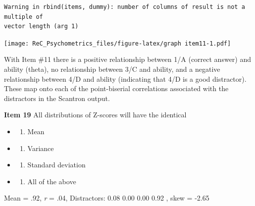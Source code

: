 \documentclass[
  english,
]{book}
\newenvironment{Shaded}{\begin{snugshade}}{\end{snugshade}}
\newcommand{\AttributeTok}[1]{\textcolor[rgb]{0.77,0.63,0.00}{#1}}
\newcommand{\DecValTok}[1]{\textcolor[rgb]{0.00,0.00,0.81}{#1}}
\newcommand{\FunctionTok}[1]{\textcolor[rgb]{0.00,0.00,0.00}{#1}}
\newcommand{\NormalTok}[1]{#1}
\newcommand{\SpecialCharTok}[1]{\textcolor[rgb]{0.00,0.00,0.00}{#1}}
\providecommand{\tightlist}{%
  \setlength{\itemsep}{0pt}\setlength{\parskip}{0pt}}
\begin{document}
\begin{verbatim}
Warning in rbind(items, dummy): number of columns of result is not a multiple of
vector length (arg 1)
\end{verbatim}

\texttt{[image: ReC\_Psychometrics\_files/figure-latex/graph item11-1.pdf]}

With Item \#11 there is a positive relationship between 1/A (correct answer) and ability (theta), no relationship between 3/C and ability, and a negative relationship between 4/D and ability (indicating that 4/D is a good distractor). These map onto each of the point-biserial correlations associated with the distractors in the Scantron output.

\textbf{Item 19} All distributions of Z-scores will have the identical

\begin{itemize}
\item
  \begin{enumerate}
  \def\labelenumi{\alph{enumi})}
  \tightlist
  \item
    Mean
  \end{enumerate}
\item
  \begin{enumerate}
  \def\labelenumi{\alph{enumi})}
  \setcounter{enumi}{1}
  \tightlist
  \item
    Variance
  \end{enumerate}
\item
  \begin{enumerate}
  \def\labelenumi{\alph{enumi})}
  \setcounter{enumi}{2}
  \tightlist
  \item
    Standard deviation
  \end{enumerate}
\item
  \begin{enumerate}
  \def\labelenumi{\alph{enumi})}
  \setcounter{enumi}{3}
  \tightlist
  \item
    All of the above
  \end{enumerate}
\end{itemize}

Mean = .92, \emph{r} = .04, Distractors: 0.08 0.00 0.00 0.92 , skew = -2.65

\begin{Shaded}
\end{Shaded}
\end{document}
